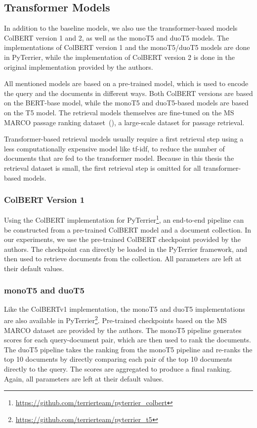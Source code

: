 \subsection{Transformer Models}
In addition to the baseline models, we also use the transformer-based models ColBERT version 1 and 2, as well as the monoT5 and duoT5 models.
The implementations of ColBERT version 1 and the monoT5/duoT5 models are done in PyTerrier, while the implementation of ColBERT version 2 is done in the original implementation provided by the authors.

All mentioned models are based on a pre-trained model, which is used to encode the query and the documents in different ways.
Both ColBERT versions are based on the BERT-base model, while the monoT5 and duoT5-based models are based on the T5 model.
The retrieval models themselves are fine-tuned on the MS MARCO passage ranking dataset~(\cite{bajaj:2016:MSMARCO}), a large-scale dataset for passage retrieval.

Transformer-based retrieval models usually require a first retrieval step using a less computationally expensive model like tf-idf, to reduce the number of documents that are fed to the transformer model.
Because in this thesis the retrieval dataset is small, the first retrieval step is omitted for all transformer-based models.

\subsubsection{ColBERT Version 1}
Using the ColBERT implementation for PyTerrier\footnote{\url{https://github.com/terrierteam/pyterrier_colbert}}, an end-to-end pipeline can be constructed from a pre-trained ColBERT model and a document collection.
In our experiments, we use the pre-trained ColBERT checkpoint provided by the authors.
The checkpoint can directly be loaded in the PyTerrier framework, and then used to retrieve documents from the collection.
All parameters are left at their default values.

\subsubsection{monoT5 and duoT5}
Like the ColBERTv1 implementation, the monoT5 and duoT5 implementations are also available in PyTerrier\footnote{\url{https://github.com/terrierteam/pyterrier_t5}}.
Pre-trained checkpoints based on the MS MARCO dataset are provided by the authors.
The monoT5 pipeline generates scores for each query-document pair, which are then used to rank the documents.
The duoT5 pipeline takes the ranking from the monoT5 pipeline and re-ranks the top 10 documents by directly comparing each pair of the top 10 documents directly to the query.
The scores are aggregated to produce a final ranking.
Again, all parameters are left at their default values.

